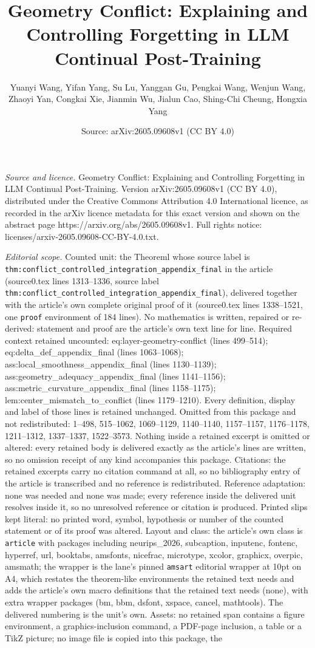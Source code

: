\documentclass[10pt,a4paper]{amsart}
\title[Geometry Conflict: Explaining and Controlling Forgetting in ]{Geometry Conflict: Explaining and Controlling Forgetting in LLM Continual Post-Training}
\author{Yuanyi Wang, Yifan Yang, Su Lu, Yanggan Gu, Pengkai Wang, Wenjun Wang, Zhaoyi Yan, Congkai Xie, Jianmin Wu, Jialun Cao, Shing-Chi Cheung, Hongxia Yang}
\date{Source: arXiv:2605.09608v1 (CC BY 4.0)}
\begin{document}
\maketitle

\noindent\emph{Source and licence.} Geometry Conflict: Explaining and Controlling Forgetting in LLM Continual Post-Training. Version arXiv:2605.09608v1 (CC BY 4.0), distributed under the Creative Commons Attribution 4.0 International licence, as recorded in the arXiv licence metadata for this exact version and shown on the abstract page https://arxiv.org/abs/2605.09608v1. Full rights notice: licenses/arxiv-2605.09608-CC-BY-4.0.txt.\par\smallskip

\noindent\textit{Editorial scope.} Counted unit: the Theoreml whose source label is \texttt{thm:conflict\_controlled\_integration\_appendix\_final} in the article (source0.tex lines 1313--1336, source label \texttt{thm:conflict\_controlled\_integration\_appendix\_final}), delivered together with the article's own complete original proof of it (source0.tex lines 1338--1521, one \texttt{proof} environment of 184 lines). No mathematics is written, repaired or re-derived: statement and proof are the article's own text line for line. Required context retained uncounted: eq:layer-geometry-conflict (lines 499--514); eq:delta\_def\_appendix\_final (lines 1063--1068); ass:local\_smoothness\_appendix\_final (lines 1130--1139); ass:geometry\_adequacy\_appendix\_final (lines 1141--1156); ass:metric\_curvature\_appendix\_final (lines 1158--1175); lem:center\_mismatch\_to\_conflict (lines 1179--1210). Every definition, display and label of those lines is retained unchanged. Omitted from this package and not redistributed: 1--498, 515--1062, 1069--1129, 1140--1140, 1157--1157, 1176--1178, 1211--1312, 1337--1337, 1522--3573. Nothing inside a retained excerpt is omitted or altered: every retained body is delivered exactly as the article's lines are written, so no omission receipt of any kind accompanies this package. Citations: the retained excerpts carry no citation command at all, so no bibliography entry of the article is transcribed and no reference is redistributed. Reference adaptation: none was needed and none was made; every reference inside the delivered unit resolves inside it, so no unresolved reference or citation is produced. Printed slips kept literal: no printed word, symbol, hypothesis or number of the counted statement or of its proof was altered. Layout and class: the article's own class is \texttt{article} with packages including neurips\_2026, subcaption, inputenc, fontenc, hyperref, url, booktabs, amsfonts, nicefrac, microtype, xcolor, graphicx, overpic, amsmath; the wrapper is the lane's pinned \texttt{amsart} editorial wrapper at 10pt on A4, which restates the theorem-like environments the retained text needs and adds the article's own macro definitions that the retained text needs (none), with extra wrapper packages (bm, bbm, dsfont, xspace, cancel, mathtools). The delivered numbering is the unit's own. Assets: no retained span contains a figure environment, a graphics-inclusion command, a PDF-page inclusion, a table or a TikZ picture; no image file is copied into this package, the 
\end{document}
